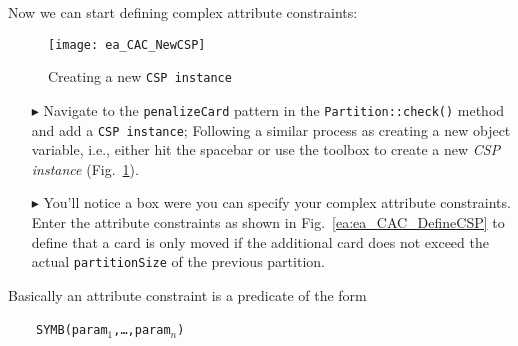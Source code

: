 Now we can start defining complex attribute constraints:
\begin{figure}[htbp]
\begin{center}
  \texttt{[image: ea\_CAC\_NewCSP]}
  \caption{Creating a new \texttt{CSP instance}}  
  \label{ea:CAC_NewCSP}
\end{center}
\end{figure}
\begin{itemize}    

\item[$\blacktriangleright$] Navigate to the \texttt{penalizeCard} pattern in the \texttt{Partition::check()} method and add a \texttt{CSP instance};  
Following a similar process as creating a new object variable, i.e., either hit the spacebar or use the toolbox to create a new \emph{CSP instance} (Fig.~\ref{ea:CAC_NewCSP}).

\item[$\blacktriangleright$] You’ll notice a box were you can specify your complex attribute constraints. Enter the attribute constraints as shown in Fig.~\ref{ea:ea_CAC_DefineCSP} to define that a card is only moved if the additional card does not exceed the actual \texttt{partitionSize} of the previous partition.

\end{itemize}

Basically an attribute constraint is a predicate of the form

~~~~\texttt{SYMB(param$_1$,\ldots,param$_n$)}

